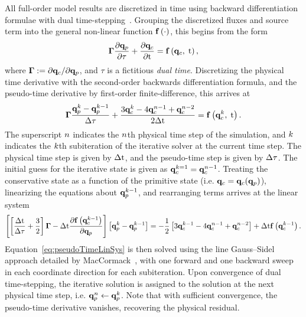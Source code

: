 All full-order model results are discretized in time using backward differentiation formulae with dual time-stepping~\cite{Pandya2003}. Grouping the discretized fluxes and source term into the general non-linear function $\mathbf{f} \left(\cdot\right)$, this begins from the form
%
\begin{equation}
	\boldsymbol{\Gamma} \frac{\partial \mathbf{q}_{p}}{\partial \tau} + \frac{\partial \mathbf{q}_{c}}{\partial \text{t}} = \mathbf{f} \left(\mathbf{q}_{c}, \; \text{t}\right),
\end{equation}
%
where $\boldsymbol{\Gamma} := \partial \mathbf{q}_{c} / \partial \mathbf{q}_{p}$, and $\tau$ is a fictitious \textit{dual time}. Discretizing the physical time derivative with the second-order backwards differentiation formula, and the pseudo-time derivative by first-order finite-difference, this arrives at
%
\begin{equation}
	\boldsymbol{\Gamma} \frac{\mathbf{q}_{p}^{k} - \mathbf{q}_{p}^{k - 1}}{\Delta \tau} + \frac{3 \mathbf{q}_{c}^{k} - 4 \mathbf{q}_{c}^{n - 1} + \mathbf{q}_{c}^{n - 2}}{2\Delta \text{t}} = \mathbf{f} \left(\mathbf{q}_{c}^{k}, \; \text{t}\right).
\end{equation}
%
The superscript $n$ indicates the $n$th physical time step of the simulation, and $k$ indicates the $k$th subiteration of the iterative solver at the current time step. The physical time step is given by $\Delta \text{t}$, and the pseudo-time step is given by $\Delta \tau$. The initial guess for the iterative state is given as $\mathbf{q}_{c}^{k=1} = \mathbf{q}_{c}^{n - 1}$. Treating the conservative state as a function of the primitive state (i.e. $\mathbf{q}_{c} = \mathbf{q}_{c}(\mathbf{q}_{p})$), linearizing the equations about $\mathbf{q}_{p}^{k - 1}$, and rearranging terms arrives at the linear system
%
\begin{equation}\label{eq:pseudoTimeLinSys}
\left[\left[\frac{\Delta \text{t}}{\Delta \tau} + \frac{3}{2}\right]\boldsymbol{\Gamma} - \Delta \text{t} \frac{\partial \mathbf{f} \left(\mathbf{q}_{c}^{k - 1}\right)}{\partial \mathbf{q}_{p}}\right] \left[\mathbf{q}_{p}^{k} - \mathbf{q}_{p}^{k - 1}\right] = - \frac{1}{2}\left[3 \mathbf{q}_{c}^{k-1} - 4 \mathbf{q}_{c}^{n - 1} + \mathbf{q}_{c}^{n - 2}\right] + \Delta \text{t} \mathbf{f} \left(\mathbf{q}_{c}^{k - 1}\right).
\end{equation}
%
Equation~\ref{eq:pseudoTimeLinSys} is then solved using the line Gauss--Sidel approach detailed by MacCormack~\cite{MacCormack1985}, with one forward and one backward sweep in each coordinate direction for each subiteration. Upon convergence of dual time-stepping, the iterative solution is assigned to the solution at the next physical time step, i.e. $\mathbf{q}_{p}^{n} \leftarrow \mathbf{q}_{p}^{k}$. Note that with sufficient convergence, the pseudo-time derivative vanishes, recovering the physical residual.

